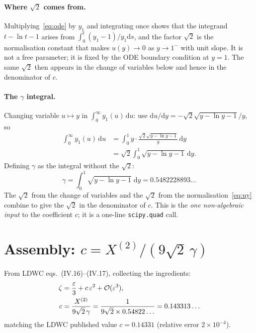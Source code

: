 \documentclass[10pt,a4paper,twocolumn]{article}
\theoremstyle{plain}
\theoremstyle{definition}
\newcommand{\dd}{\mathrm{d}}
\newcommand{\eps}{\varepsilon}
\begin{document}
\paragraph{Where $\sqrt{2}$ comes from.}
Multiplying~\eqref{eq:ode} by $y_1$ and integrating once shows that
the integrand $t - \ln t - 1$ arises from $\int_0^t (y_1-1)/y_1 \dd s$,
and the factor $\sqrt{2}$ is the normalisation constant that makes
$u(y) \to 0$ as $y\to 1^-$ with unit slope.  It is not a free
parameter; it is fixed by the ODE boundary condition at $y=1$.
The same $\sqrt{2}$ then appears in the change of variables
below and hence in the denominator of $c$.

\paragraph{The $\gamma$ integral.}
Changing variable $u \mapsto y$ in
$\int_0^\infty y_1(u)\,\dd u$:
use $\dd u / \dd y = -\sqrt{2}\sqrt{y-\ln y-1}/y$, so
\begin{align*}
  \int_0^\infty\! y_1(u)\,\dd u
  &= \int_0^1\! y \cdot \frac{\sqrt{2}\sqrt{y-\ln y-1}}{y}\,\dd y\\
  &= \sqrt{2}\int_0^1\!\sqrt{y-\ln y-1}\,\dd y.
\end{align*}
Defining $\gamma$ as the integral without the $\sqrt{2}$:
\begin{equation}\label{eq:gamma}
  \boxed{\gamma = \int_0^1\!\sqrt{y - \ln y - 1}\;\dd y
    = 0.5482228893\ldots}
\end{equation}
The $\sqrt{2}$ from the change of variables and the $\sqrt{2}$ from
the normalisation~\eqref{eq:uy} combine to give the $\sqrt{2}$
in the denominator of $c$.  This is the \emph{one non-algebraic input}
to the coefficient $c$; it is a one-line \texttt{scipy.quad} call.

\section{Assembly: $c = X^{(2)} / (9\sqrt{2}\,\gamma)$}
\label{sec:assembly}

From LDWC eqs.~(IV.16)--(IV.17), collecting the ingredients:
\begin{align}\label{eq:c}
  \zeta &= \frac{\eps}{3} + c\,\eps^2 + \mathcal{O}(\eps^3),\\
  c &= \frac{X^{(2)}}{9\sqrt{2}\,\gamma}
     = \frac{1}{9\sqrt{2}\times 0.54822\ldots} = 0.143313\ldots\notag
\end{align}
matching the LDWC published value $c = 0.14331$ (relative error
$2\times 10^{-4}$).
\end{document}
